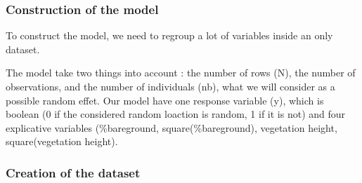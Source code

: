 \documentclass[
]{article}
\newenvironment{Shaded}{\begin{snugshade}}{\end{snugshade}}
\newcommand{\AttributeTok}[1]{\textcolor[rgb]{0.13,0.29,0.53}{#1}}
\newcommand{\DecValTok}[1]{\textcolor[rgb]{0.00,0.00,0.81}{#1}}
\newcommand{\FunctionTok}[1]{\textcolor[rgb]{0.13,0.29,0.53}{\textbf{#1}}}
\newcommand{\NormalTok}[1]{#1}
\newcommand{\OtherTok}[1]{\textcolor[rgb]{0.56,0.35,0.01}{#1}}
\newcommand{\SpecialCharTok}[1]{\textcolor[rgb]{0.81,0.36,0.00}{\textbf{#1}}}
\newcommand{\StringTok}[1]{\textcolor[rgb]{0.31,0.60,0.02}{#1}}
\begin{document}
\subsubsection{Construction of the
model}\label{construction-of-the-model}

To construct the model, we need to regroup a lot of variables inside an
only dataset.

The model take two things into account : the number of rows (N), the
number of observations, and the number of individuals (nb), what we will
consider as a possible random effet. Our model have one response
variable (y), which is boolean (0 if the considered random loaction is
random, 1 if it is not) and four explicative variables (\%bareground,
square(\%bareground), vegetation height, square(vegetation height).

\subsubsection{Creation of the dataset}\label{creation-of-the-dataset}

\begin{Shaded}
\end{Shaded}
\end{document}
